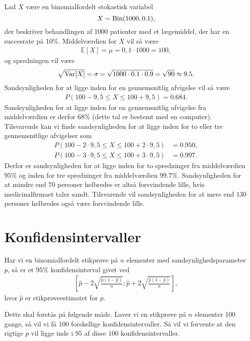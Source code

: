 \begin{exa}
Lad $X$ være en binomialfordelt stokastisk variabel
\[
X \sim \textnormal{Bin}(1000,0.1),
\]
der beskriver behandlingen af 1000 patienter med et lægemiddel, der har en succesrate på 10$\%$. Middelværdien for $X$ vil så være
\begin{align*}
\mathbb{E}[X] = \mu = 0,1\cdot 1000 = 100,
\end{align*}
og spredningen vil være
\begin{align*}
\sqrt{\textnormal{Var}[X]} = \sigma = \sqrt{1000\cdot 0.1 \cdot 0.9} = \sqrt{90} \approx 9.5.
\end{align*}
Sandsynligheden for at ligge inden for en gennemsnitlig afvigelse vil så være
\begin{align*}
P(100-9,5 \leq X \leq 100+9,5) = 0.684.
\end{align*}
Sandsynligheden for at ligge inden for en gennemsnitlig afvigelse fra middelværdien er derfor $68\%$ (dette tal er bestemt med en computer). Tilsvarende kan vi finde sandsynligheden for at ligge inden for to eller tre gennemsnitlige afvigelser som
\begin{align*}
P(100-2\cdot 9,5 \leq X \leq 100+2\cdot 9,5 ) &= 0.950,\\
P(100-3\cdot 9,5 \leq X \leq 100+3\cdot 9,5) &= 0.997.
\end{align*}
Derfor er sandsynligheden for at ligge inden for to spredninger fra middelværdien $95\%$ og inden for tre spredninger fra middelværdien $99.7\%$. Sandsynligheden for at mindre end $70$ personer helbredes er altså forsvindende lille, hvis medicinalfirmaet taler sandt. Tilsvarende vil sandsynligheden for at mere end $130$ personer helbredes også være forsvindende lille. 
\end{exa}


\section*{Konfidensintervaller}
\begin{setn}
Har vi en binomialfordelt stikprøve på $n$ elementer med sandsynlighedsparameter $p$, så er et $95\%$ konfidensinterval givet ved
\begin{align*}
\left[ \hat{p} - 2\sqrt{\frac{\hat{p}(1-\hat{p})}{n}};\hat{p} + 2\sqrt{\frac{\hat{p}(1-\hat{p})}{n}}\right],
\end{align*}
hvor $\hat{p}$ er stikprøveestimatet for $p$. 
\end{setn}
Dette skal forstås på følgende måde. Laver vi en stikprøve på $n$ elementer 100 gange, så vil vi få 100 forskellige konfidensintervaller. Så vil vi forvente at den rigtige $p$ vil ligge inde i $95$ af disse $100$ konfidensintervaller.

